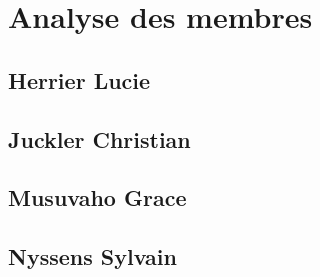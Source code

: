 \section{Analyse des membres}
\subsection{Herrier Lucie}
\subsection{Juckler Christian}
\subsection{Musuvaho Grace}
\subsection{Nyssens Sylvain}